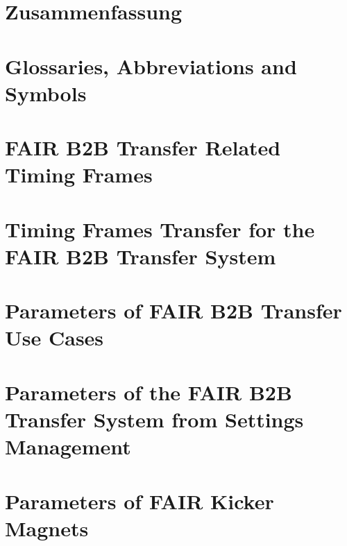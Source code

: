 \documentclass[12pt,twoside]{report}
\renewcommand{\_}{%
  \textunderscore\hspace{0pt}%
}
\begin{document}
\chapter*{Zusammenfassung}

%

\appendix
\chapter*{Glossaries, Abbreviations and Symbols}
\printnoidxglossary

\printnoidxglossary[type=abbreslist,style=long]
\printnoidxglossary[type=symbolslist,style=long]


\chapter{FAIR B2B Transfer Related Timing Frames}


\chapter{Timing Frames Transfer for the FAIR B2B Transfer System}


\chapter{Parameters of FAIR B2B Transfer Use Cases}

\chapter{Parameters of the FAIR B2B Transfer System from Settings Management}

\chapter{Parameters of FAIR Kicker Magnets}

\end{document}
